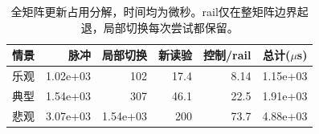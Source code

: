 \begin{table}[htbp]\centering\small
\begin{tabular}{@{}lrrrrr@{}}\toprule
情景 & 脉冲 & 局部切换 & 新读验 & 控制/rail & 总计($\mu$s)\\\midrule
乐观 & 1.02e+03 & 102 & 17.4 & 8.14 & 1.15e+03\\
典型 & 1.54e+03 & 307 & 46.1 & 22.5 & 1.91e+03\\
悲观 & 3.07e+03 & 1.54e+03 & 200 & 73.7 & 4.88e+03\\
\bottomrule\end{tabular}
\caption{全矩阵更新占用分解，时间均为微秒。rail仅在整矩阵边界起退，局部切换每次尝试都保留。}\end{table}
